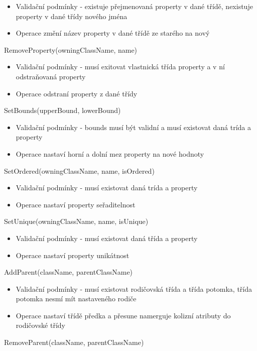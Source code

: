 \documentclass[11pt,twoside,a4paper]{book}
\begin{document}
\begin{list}{Operace :}{}
\begin{itemize}
    \item Validační podmínky - existuje přejmenovaná property v dané třídě,
    nexistuje property v dané třídy nového jména
    \item  Operace změní název property v dané třídě ze starého na nový
  \end{itemize}
  \item RemoveProperty(owningClassName, name)
  \begin{itemize}
    \item Validační podmínky - musí exitovat vlastnická třída property a v ní
    odstraňovaná property
    \item  Operace odstraní property z dané třídy
  \end{itemize}
  \item SetBounds(upperBound, lowerBound)
  \begin{itemize}
    \item Validační podmínky - bounds musí být validní a musí existovat daná
    trída a property
    \item  Operace nastaví horní a dolní mez property na nové hodnoty
  \end{itemize}
  \item SetOrdered(owningClassName, name, isOrdered)
  \begin{itemize}
    \item Validační podmínky - musí existovat daná trída a property
    \item  Operace nastaví property seřaditelnost
  \end{itemize}
  \item SetUnique(owningClassName, name, isUnique)
  \begin{itemize}
    \item Validační podmínky - musí existovat daná třída a property
    \item  Operace nastaví property unikátnost
  \end{itemize}
  \item AddParent(className, parentClassName)
  \begin{itemize}
    \item Validační podmínky - musí existovat rodičovská třída a třída potomka,
    třída potomka nesmí mít nastaveného rodiče
    \item Operace nastaví třídě předka a přesune namerguje kolizní atributy do
    rodičovské třídy
  \end{itemize}
  \item RemoveParent(className, parentClassName)

\end{list}
\end{document}
